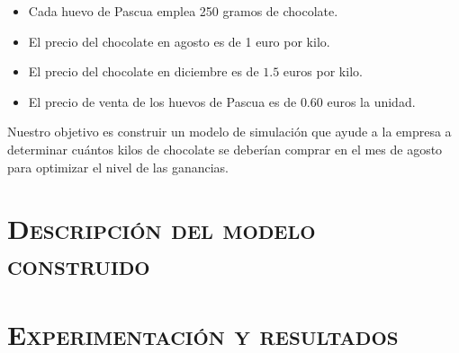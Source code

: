 \documentclass[11pt,a4paper]{article}
\begin{document}
\begin{itemize}[label=\textbullet]
	\item Cada huevo de Pascua emplea 250 gramos de chocolate.
	\item El precio del chocolate en agosto es de 1 euro por kilo.
	\item El precio del chocolate en diciembre es de $1.5$ euros por kilo.
	\item El precio de venta de los huevos de Pascua es de $0.60$ euros la unidad.
\end{itemize}

Nuestro objetivo es construir un modelo de simulación que ayude a la empresa a determinar
cuántos kilos de chocolate se deberían comprar en el mes de agosto para optimizar el nivel
de las ganancias.

\section{\textsc{Descripción del modelo construido}}

\section{\textsc{Experimentación y resultados}}
\end{document}
